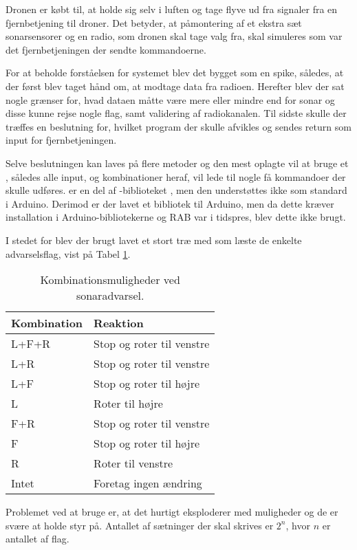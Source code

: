 \documentclass[Main]{subfiles}
\begin{document}
Dronen er købt til, at holde sig selv i luften og tage flyve ud fra signaler fra en fjernbetjening til droner.
Det betyder, at påmontering af et ekstra sæt sonarsensorer og en radio, som dronen skal tage valg fra, skal simuleres som var det fjernbetjeningen der sendte kommandoerne.

For at beholde forståelsen for systemet blev det bygget som en spike, således, at der først blev taget hånd om, at modtage data fra radioen.
Herefter blev der sat nogle grænser for, hvad dataen måtte være mere eller mindre end for sonar og disse kunne rejse nogle flag, samt validering af radiokanalen.
Til sidste skulle der træffes en beslutning for, hvilket program der skulle afvikles og sendes return som input for fjernbetjeningen.

Selve beslutningen kan laves på flere metoder og den mest oplagte vil at bruge et , således alle input, og kombinationer heraf, vil lede til nogle få kommandoer der skulle udføres.
 er en del af -biblioteket \cite{stl}, men den understøttes ikke som standard i Arduino.
Derimod er der lavet et bibliotek til Arduino\cite{Arduino-stl}, men da dette kræver installation i Arduino-bibliotekerne og RAB var i tidspres, blev dette ikke brugt.

I stedet for  blev der brugt lavet et stort træ med  som læste de enkelte advarselsflag, vist på Tabel \ref{Tab:SonarAdvarsel}.

\begin{table}[H]
\centering
	\begin{tabular}{l l}
	\hline Kombination & Reaktion
	\\ \hline 
	L+F+R & Stop og roter til venstre \\
	L+R & Stop og roter til venstre\\
	L+F & Stop og roter til højre\\
	L & Roter til højre\\
	F+R & Stop og roter til venstre\\
	F & Stop og roter til højre\\
	R & Roter til venstre\\
	Intet & Foretag ingen ændring \\ \hline
	\end{tabular}
\caption{Kombinationsmuligheder ved sonaradvarsel.}
\label{Tab:SonarAdvarsel}
\end{table}

Problemet ved at bruge  er, at det hurtigt eksploderer med muligheder og de er svære at holde styr på.
Antallet af sætninger der skal skrives er $2^n$, hvor $n$ er antallet af flag.
\end{document}
